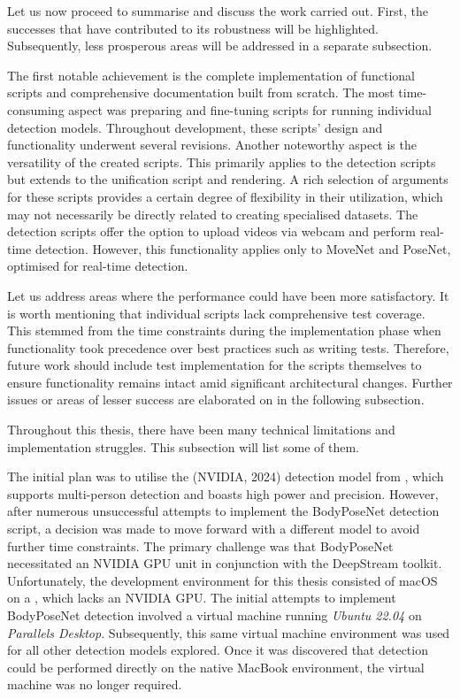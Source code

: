 
Let us now proceed to summarise and discuss the work carried out. First, the successes that have contributed to its robustness will be highlighted. Subsequently, less prosperous areas will be addressed in a separate subsection.

The first notable achievement is the complete implementation of functional scripts and comprehensive documentation built from scratch. The most time-consuming aspect was preparing and fine-tuning scripts for running individual detection models. Throughout development, these scripts' design and functionality underwent several revisions. Another noteworthy aspect is the versatility of the created scripts. This primarily applies to the detection scripts but extends to the unification script and rendering. A rich selection of arguments for these scripts provides a certain degree of flexibility in their utilization, which may not necessarily be directly related to creating specialised datasets. The detection scripts offer the option to upload videos via webcam and perform real-time detection. However, this functionality applies only to MoveNet and PoseNet, optimised for real-time detection.

Let us address areas where the performance could have been more satisfactory. It is worth mentioning that individual scripts lack comprehensive test coverage. This stemmed from the time constraints during the implementation phase when functionality took precedence over best practices such as writing tests. Therefore, future work should include test implementation for the scripts themselves to ensure functionality remains intact amid significant architectural changes. Further issues or areas of lesser success are elaborated on in the following subsection.

Throughout this thesis, there have been many technical limitations and im\-plementation struggles. This subsection will list some of them.

The initial plan was to utilise the  (NVIDIA, 2024) detection model from , which supports multi-person detection and boasts high power and precision. However, after numerous unsuccessful attempts to implement the BodyPoseNet detection script, a decision was made to move forward with a different model to avoid further time constraints. The primary challenge was that BodyPoseNet necessitated an NVIDIA GPU unit in conjunction with the DeepStream toolkit. Unfortunately, the development environment for this thesis consisted of macOS  on a , which lacks an NVIDIA GPU. The initial attempts to implement BodyPoseNet detection involved a virtual machine running {\em Ubuntu 22.04} on {\em Parallels Desktop}. Subsequently, this same virtual machine environment was used for all other detection models explored. Once it was discovered that detection could be performed directly on the native MacBook environment, the virtual machine was no longer required.

